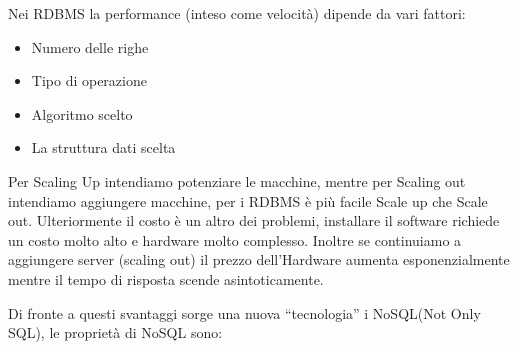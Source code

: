 \documentclass[a4page, 11pt]{article}
\begin{document}
Nei RDBMS la performance (inteso come velocità) dipende da vari fattori:
\begin{itemize}[noitemsep]
	 
	\item
	Numero delle righe
	\item
	Tipo di operazione
	\item
	Algoritmo scelto
	\item
	La struttura dati scelta
\end{itemize}

Per Scaling Up intendiamo potenziare le macchine, mentre per Scaling out intendiamo aggiungere macchine, per i RDBMS è più facile Scale up che Scale out. 
Ulteriormente il costo è un altro dei problemi, installare il software richiede un costo molto alto e hardware molto complesso.
Inoltre se continuiamo a aggiungere server (scaling out) il prezzo dell'Hardware aumenta esponenzialmente mentre il tempo di risposta scende asintoticamente.

Di fronte a questi svantaggi sorge una nuova ``tecnologia'' i NoSQL(Not Only SQL), le proprietà di NoSQL sono:
\end{document}
